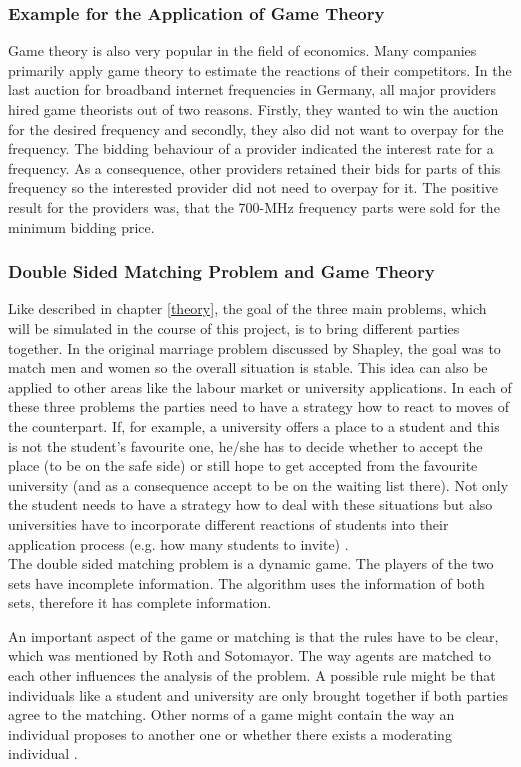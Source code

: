 \subsubsection{Example for the Application of Game Theory}
Game theory is also very popular in the field of economics.
Many companies primarily apply game theory to estimate the reactions of their competitors. 
In the last auction for broadband internet frequencies in Germany, all major providers hired game theorists out of two reasons. 
Firstly, they wanted to win the auction for the desired frequency and secondly, they also did not want to overpay for the frequency.
The bidding behaviour of a provider indicated the interest rate for a frequency. 
As a consequence, other providers retained their bids for parts of this frequency so the interested provider did not need to overpay for it. 
The positive result for the providers was, that the 700-MHz frequency parts were sold for the minimum bidding price. \cite{gametheoryWelt}

\subsubsection{Double Sided Matching Problem and Game Theory}

Like described in chapter \ref{theory}, the goal of the three main problems, which will be simulated in the course of this project, is to bring different parties together.
In the original marriage problem discussed by Shapley, the goal was to match men and women so the overall situation is stable.
This idea can also be applied to other areas like the labour market or university applications.
In each of these three problems the parties need to have a strategy how to react to moves of the counterpart.
If, for example, a university offers a place to a student and this is not the student's favourite one, he/she has to decide whether to accept the place (to be on the safe side) or still hope to get accepted from the favourite university (and as a consequence accept to be on the waiting list there).
Not only the student needs to have a strategy how to deal with these situations but also universities have to incorporate different reactions of students into their application process (e.g. how many students to invite) \cite{gale62a}. \\
The double sided matching problem is a dynamic game.
The players of the two sets have incomplete information.
The algorithm uses the information of both sets, therefore it has complete information.

An important aspect of the game or matching is that the rules have to be clear, which was mentioned by Roth and Sotomayor.
The way agents are matched to each other influences the analysis of the problem.
A possible rule might be that individuals like a student and university are only brought together if both parties agree to the matching.
Other norms of a game might contain the way an individual proposes to another one or whether there exists a moderating individual \cite[p. 492]{roth1992two}.